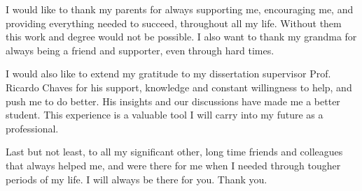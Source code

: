 
I would like to thank my parents for always supporting me, encouraging me, and providing everything needed to succeed, throughout all my life. Without them this work and degree would not be possible. I also want to thank my grandma for always being a friend and supporter, even through hard times.

I would also like to extend my gratitude to my dissertation supervisor Prof. Ricardo Chaves for his support, knowledge and constant willingness to help, and push me to do better. His insights and our discussions have made me a better student. This experience is a valuable tool I will carry into my future as a professional.

Last but not least, to all my significant other, long time friends and colleagues that always helped me, and were there for me when I needed through tougher periods of my life. I will always be there for you. Thank you.





